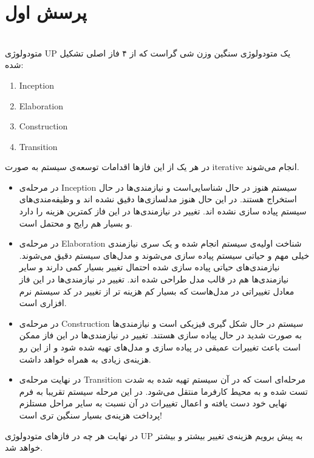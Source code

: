 
\section{پرسش اول}\ \\
متودولوژی UP یک متودولوژی سنگین وزن شی گراست که از ۴ فاز اصلی تشکیل شده:
\begin{enumerate}
	\item Inception
	\item Elaboration
	\item Construction
	\item Transition
\end{enumerate}
در هر یک از این فاز‌ها اقدامات توسعه‌ی سیستم به صورت iterative انجام می‌شوند.
\begin{itemize}
\item 
در مرحله‌ی Inception سیستم هنوز در حال شناسایی‌است و نیاز‌مندی‌ها در حال استخراج هستند. در این حال هنوز مدلسازی‌ها دقیق نشده اند و وظیفه‌مندی‌های سیستم پیاده سازی نشده اند. تغییر در نیازمندی‌ها در این فاز کمترین هزینه را دارد و بسیار هم رایج و محتمل است.
\item
در مرحله‌ی Elaboration شناخت اولیه‌ی سیستم انجام شده و یک سری نیازمندی خیلی مهم و حیاتی سیستم پیاده سازی می‌شوند و مدل‌های سیستم دقیق می‌شوند. نیازمندی‌های حیاتی پیاده سازی شده احتمال تغییر بسیار کمی دارند و سایر نیازمندی‌ها هم در قالب مدل طراحی شده اند. تغییر در نیازمندی‌ها در این فاز معادل تغییراتی در مدل‌هاست که بسیار کم هزینه تر از تغییر در کد سیستم نرم افزاری است.
\item
در مرحله‌ی Construction سیستم در حال شکل گیری فیزیکی است و نیازمندی‌ها به صورت شدید در حال پیاده سازی هستند. تغییر در نیازمندی‌ها در این فاز ممکن است باعث تغییرات عمیقی در پیاده سازی و مدل‌های تهیه شده شود و از این رو هزینه‌ی زیادی به همراه خواهد داشت.
\item
در نهایت مرحله‌ی Transition مرحله‌ای است که در آن سیستم تهیه شده به شدت تست شده و به محیط کارفرما منتقل می‌شود. در این مرحله سیستم تقریبا به فرم نهایی خود دست یافته  و اعمال تغییرات در آن نسبت به سایر مراحل مستلزم پرداخت هزینه‌ی بسیار سنگین تری است!
\end{itemize}

در نهایت هر چه در فاز‌های متودولوژی UP به پیش برویم هزینه‌ی تغییر بیشتر و بیشتر خواهد شد.
